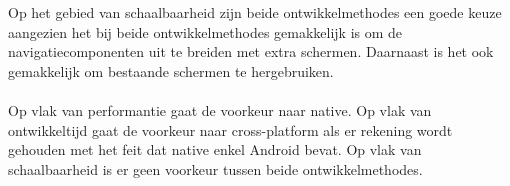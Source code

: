 \\\\
Op het gebied van schaalbaarheid zijn beide ontwikkelmethodes een goede keuze aangezien 
het bij beide ontwikkelmethodes gemakkelijk is om de navigatiecomponenten uit te breiden met extra schermen. 
Daarnaast is het ook gemakkelijk om bestaande schermen te hergebruiken.
\\\\
Op vlak van performantie gaat de voorkeur naar native. Op vlak van ontwikkeltijd gaat de voorkeur naar cross-platform
als er rekening wordt gehouden met het feit dat native enkel Android bevat. Op vlak van schaalbaarheid 
is er geen voorkeur tussen beide ontwikkelmethodes.




















